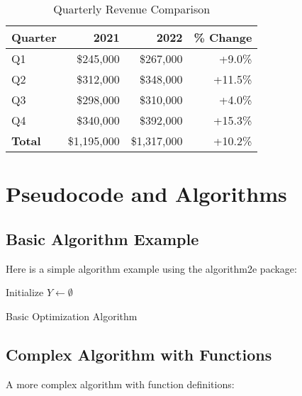 \documentclass[a4paper,11pt]{article}
\begin{document}
\vspace{1cm}

\begin{table}[htbp]
\caption{Quarterly Revenue Comparison}
\centering
{}
\begin{tabular}{lrrr}
\rowcolor{headerbg}
\textcolor{headertext}{\textbf{Quarter}} & 
\textcolor{headertext}{\textbf{2021}} & 
\textcolor{headertext}{\textbf{2022}} & 
\textcolor{headertext}{\textbf{\% Change}} \\
\toprule
Q1 & \$245,000 & \$267,000 & +9.0\% \\
Q2 & \$312,000 & \$348,000 & +11.5\% \\
Q3 & \$298,000 & \$310,000 & +4.0\% \\
Q4 & \$340,000 & \$392,000 & +15.3\% \\
\midrule
\textbf{Total} & \$1,195,000 & \$1,317,000 & +10.2\% \\
\bottomrule
\end{tabular}
\end{table}
\section{Pseudocode and Algorithms}
\label{sec:algorithms}

\subsection{Basic Algorithm Example}

Here is a simple algorithm example using the algorithm2e package:

\begin{algorithm}[H]
	\SetAlgoLined
	Initialize $Y \gets \emptyset$\;
	\;
	\caption{Basic Optimization Algorithm}
\end{algorithm}

\subsection{Complex Algorithm with Functions}

A more complex algorithm with function definitions:
\end{document}
